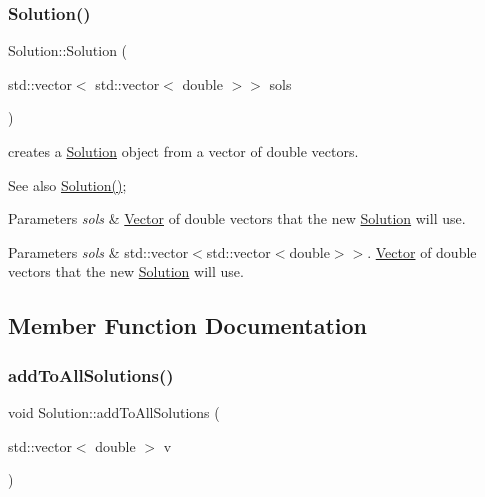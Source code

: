 \subsubsection{\texorpdfstring{Solution()}{Solution()}\hspace{0.1cm}{\footnotesize\ttfamily [2/2]}}
{\footnotesize\ttfamily Solution\+::\+Solution (\begin{DoxyParamCaption}\item[{std\+::vector$<$ std\+::vector$<$ double $>$$>$}]{sols }\end{DoxyParamCaption})}

creates a \hyperlink{class_solution}{Solution} object from a vector of double vectors. \begin{DoxySeeAlso}{See also}
\hyperlink{class_solution_ab55bd4b023d596ce11aaf737b9a6123b}{Solution()}; 
\end{DoxySeeAlso}

\begin{DoxyParams}{Parameters}
{\em sols} & \hyperlink{class_vector}{Vector} of double vectors that the new \hyperlink{class_solution}{Solution} will use. \\
\hline
\end{DoxyParams}

\begin{DoxyParams}{Parameters}
{\em sols} & std\+::vector$<$std\+::vector$<$double$>$$>$. \hyperlink{class_vector}{Vector} of double vectors that the new \hyperlink{class_solution}{Solution} will use. \\
\hline
\end{DoxyParams}


\subsection{Member Function Documentation}
\mbox{\label{class_solution_a0ea58d9480ccb4e344c377f4861e1e7f}} 
\subsubsection{\texorpdfstring{add\+To\+All\+Solutions()}{addToAllSolutions()}}
{\footnotesize\ttfamily void Solution\+::add\+To\+All\+Solutions (\begin{DoxyParamCaption}\item[{std\+::vector$<$ double $>$}]{v }\end{DoxyParamCaption})}

